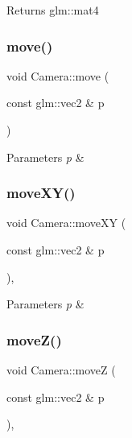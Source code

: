 \begin{DoxyReturn}{Returns}
glm\+::mat4 
\end{DoxyReturn}
\mbox{\label{class_camera_a7ac215b4c76c1864c8c339127f4586ef}} 
\subsubsection{\texorpdfstring{move()}{move()}}
{\footnotesize\ttfamily void Camera\+::move (\begin{DoxyParamCaption}\item[{const glm\+::vec2 \&}]{p }\end{DoxyParamCaption})\hspace{0.3cm}{\ttfamily [inline]}}


\begin{DoxyParams}{Parameters}
{\em p} & \\
\hline
\end{DoxyParams}
\mbox{\label{class_camera_a53a4ce8177d8622bcc01ae9a8f8fe391}} 
\subsubsection{\texorpdfstring{move\+X\+Y()}{moveXY()}}
{\footnotesize\ttfamily void Camera\+::move\+XY (\begin{DoxyParamCaption}\item[{const glm\+::vec2 \&}]{p }\end{DoxyParamCaption})\hspace{0.3cm}{\ttfamily [inline]}, {\ttfamily [protected]}}


\begin{DoxyParams}{Parameters}
{\em p} & \\
\hline
\end{DoxyParams}
\mbox{\label{class_camera_a7c6676296255f1aef549228bf1c0a715}} 
\subsubsection{\texorpdfstring{move\+Z()}{moveZ()}}
{\footnotesize\ttfamily void Camera\+::moveZ (\begin{DoxyParamCaption}\item[{const glm\+::vec2 \&}]{p }\end{DoxyParamCaption})\hspace{0.3cm}{\ttfamily [inline]}, {\ttfamily [protected]}}


